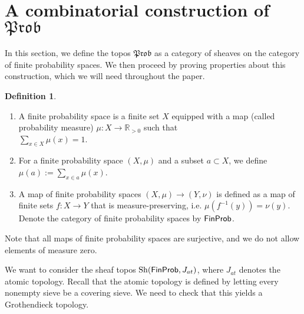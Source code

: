 \documentclass[a4paper]{amsproc}
\theoremstyle{plain}
\theoremstyle{definition}
\newtheorem{definition}[theorem]{Definition}
\theoremstyle{remark}
\numberwithin{equation}{section}
\DeclareMathOperator{\Sh}{Sh}
\newcommand{\FinProb}{\textup{\textsf{FinProb}}}
\newcommand{\Prob}{\mathfrak{Prob}}
\begin{document}
\section{A combinatorial construction of $\Prob$}\label{section_combinatorial}

In this section, we define the topos $\Prob$ as a category of sheaves on the category of finite probability spaces. We then proceed by proving properties about this construction, which we will need throughout the paper.


\begin{definition}
    \mbox{}
    \begin{enumerate}
        \item A finite probability space is a finite set $X$ equipped with a map (called probability measure) $\mu: X \to \mathbb{R}_{>0}$ such that \\ $\sum_{x \in X} \mu(x) = 1$.
        \item For a finite probability space $(X,\mu)$ and a subset $a \subset X$, we define $\mu(a) := \sum_{x \in a} \mu(x)$.
        \item A map of finite probability spaces $(X,\mu) \to (Y,\nu)$ is defined as a map of finite sets $f: X \to Y$ that is measure-preserving, i.e. $\mu(f^{-1}(y)) = \nu(y)$. Denote the category of finite probability spaces by $\FinProb$.
    \end{enumerate}
\end{definition}

Note that all maps of finite probability spaces are surjective, and we do not allow elements of measure zero.

We want to consider the sheaf topos $\Sh(\FinProb, J_{at})$, where $J_{at}$ denotes the atomic topology. Recall that the atomic topology is defined by letting every nonempty sieve be a covering sieve. We need to check that this yields a Grothendieck topology.
\end{document}
